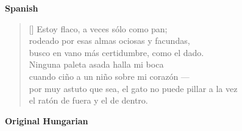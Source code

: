 \documentclass[a4paper,12pt,twoside,final]{book}
\begin{document}
\noindent \textbf{Spanish}


\settowidth{\versewidth}{por muy astuto que sea, el gato no puede pillar a la vez}

\begin{verse}[\versewidth]
  Estoy flaco, a veces sólo como pan; \\
  rodeado por esas almas ociosas y facundas, \\
  busco en vano más certidumbre, como el dado. \\
  Ninguna paleta asada halla mi boca \\
  cuando ciño a un niño sobre mi corazón --- \\
  por muy astuto que sea, el gato no puede pillar a la vez \\
  el ratón de fuera y el de dentro. \\
\end{verse}

\newpage


\noindent \textbf{Original Hungarian}


\settowidth{\versewidth}{számhoz s szivemhez kisgyerek ---}
\end{document}
